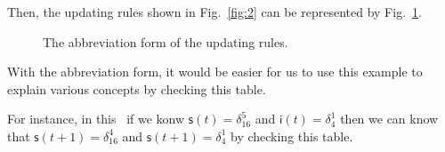 Then, the updating rules shown in Fig.~\ref{fig:2} can be represented by Fig.~\ref{fig:6}.
 \begin{figure}[thpb]
      \centering
      
      \caption{The abbreviation form of the updating rules.}
      \label{fig:6}
   \end{figure}
   With the abbreviation form, it would be easier for us to use this example to explain various concepts by checking this table.
   
   For instance, in this \BCN\ if we konw $\mathsf{s}(t)=\delta^5_{16}$ and $\mathsf{i}(t)=\delta^1_{4}$ then we can know that $\mathsf{s}(t+1)=\delta^4_{16}$  and $\mathsf{s}(t+1)=\delta^1_{4}$ by checking this table. 
   
